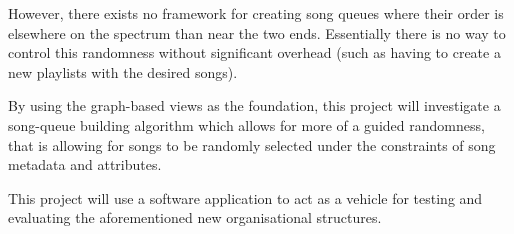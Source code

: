 However, there exists no framework for creating song queues where their order is elsewhere on the spectrum than near the two ends. Essentially there is no way to control this randomness without significant overhead (such as having to create a new playlists with the desired songs).


By using the graph-based views as the foundation, this project will investigate a song-queue building algorithm which allows for more of a guided randomness, that is allowing for songs to be randomly selected under the constraints of song metadata and attributes.

This project will use a software application to act as a vehicle for testing and evaluating the aforementioned new organisational structures.


